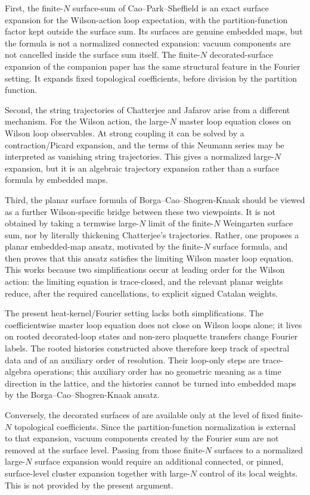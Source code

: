 \documentclass[11pt,a4paper,reqno]{amsart}
\theoremstyle{definition}
\theoremstyle{remark}
\begin{document}
First, the finite-$N$ surface-sum of Cao--Park--Sheffield \cite{CPS25} is an exact surface expansion for the Wilson-action loop expectation, with the partition-function factor kept outside the surface sum.  Its surfaces are genuine embedded maps, but the formula is not a normalized connected expansion: vacuum components are not cancelled inside the surface sum itself.  The finite-$N$ decorated-surface expansion of the companion paper \cite{Lem26a} has the same structural feature in the Fourier setting.  It expands fixed topological coefficients, before division by the partition function.

Second, the string trajectories of Chatterjee and Jafarov \cite{Cha19,Jaf16} arise from a different mechanism. For the Wilson action, the large-$N$ master loop equation closes on Wilson loop observables. At strong coupling it can be solved by a contraction/Picard expansion, and the terms of this Neumann series may be interpreted as vanishing string trajectories.  This gives a normalized large-$N$ expansion, but it is an algebraic trajectory expansion rather than a surface formula by embedded maps.

Third, the planar surface formula of Borga--Cao--Shogren-Knaak \cite{BCSK24,BCSK25} should be viewed as a further Wilson-specific bridge between these two viewpoints.  It is not obtained by taking a termwise large-$N$ limit of the finite-$N$ Weingarten surface sum, nor by literally thickening Chatterjee's trajectories.  Rather, one proposes a planar embedded-map ansatz, motivated by the finite-$N$ surface formula, and then proves that this ansatz satisfies the limiting Wilson master loop equation.  This works because two simplifications occur at leading order for the Wilson action: the limiting equation is trace-closed, and the relevant planar weights reduce, after the required cancellations, to explicit signed Catalan weights.

The present heat-kernel/Fourier setting lacks both simplifications.  The coefficientwise master loop equation does not close on Wilson loops alone; it lives on rooted decorated-loop states and non-zero plaquette transfers change Fourier labels.  The rooted histories constructed above therefore keep track of spectral data and of an auxiliary order of resolution.  Their loop-only steps are trace-algebra operations; this auxiliary order has no geometric meaning as a time direction in the lattice, and the histories cannot be turned into embedded maps by the Borga--Cao--Shogren-Knaak ansatz.

Conversely, the decorated surfaces of \cite{Lem26a} are available only at the level of fixed finite-$N$ topological coefficients.  Since the partition-function normalization is external to that expansion, vacuum components created by the Fourier sum are not removed at the surface level.  Passing from those finite-$N$ surfaces to a normalized large-$N$ surface expansion would require an additional connected, or pinned, surface-level cluster expansion together with large-$N$ control of its local weights.  This is not provided by the present argument.
\end{document}
